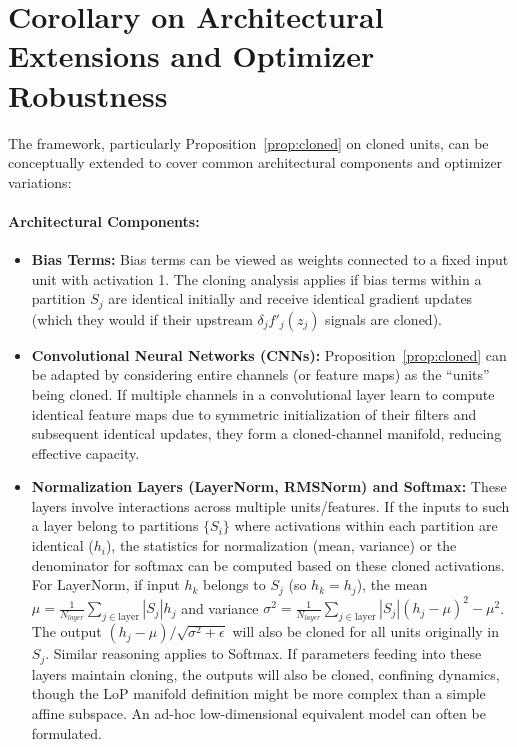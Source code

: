 \documentclass{article}
\begin{document}
\section{Corollary on Architectural Extensions and Optimizer Robustness}
\label{app:arch_extensions}
The framework, particularly Proposition~\ref{prop:cloned} on cloned units, can be conceptually extended to cover common architectural components and optimizer variations:

\paragraph{Architectural Components:}
\begin{itemize}
    \item \textbf{Bias Terms:} Bias terms can be viewed as weights connected to a fixed input unit with activation 1. The cloning analysis applies if bias terms within a partition $S_j$ are identical initially and receive identical gradient updates (which they would if their upstream $\delta_j f'_j(z_j)$ signals are cloned).
    \item \textbf{Convolutional Neural Networks (CNNs):} Proposition~\ref{prop:cloned} can be adapted by considering entire channels (or feature maps) as the ``units'' being cloned. If multiple channels in a convolutional layer learn to compute identical feature maps due to symmetric initialization of their filters and subsequent identical updates, they form a cloned-channel manifold, reducing effective capacity.
    \item \textbf{Normalization Layers (LayerNorm, RMSNorm) and Softmax:} These layers involve interactions across multiple units/features. If the inputs to such a layer belong to partitions $\{S_i\}$ where activations within each partition are identical ($h_i$), the statistics for normalization (mean, variance) or the denominator for softmax can be computed based on these cloned activations. For LayerNorm, if input $h_k$ belongs to $S_j$ (so $h_k = h_j$), the mean $\mu = \frac{1}{N_{layer}}\sum_{j \in \text{layer}} |S_j| h_j$ and variance $\sigma^2 = \frac{1}{N_{layer}}\sum_{j \in \text{layer}} |S_j| (h_j - \mu)^2 - \mu^2$. The output $(h_j - \mu) / \sqrt{\sigma^2 + \epsilon}$ will also be cloned for all units originally in $S_j$. Similar reasoning applies to Softmax. If parameters feeding into these layers maintain cloning, the outputs will also be cloned, confining dynamics, though the LoP manifold definition might be more complex than a simple affine subspace. An ad-hoc low-dimensional equivalent model can often be formulated.
\end{itemize}
\end{document}
